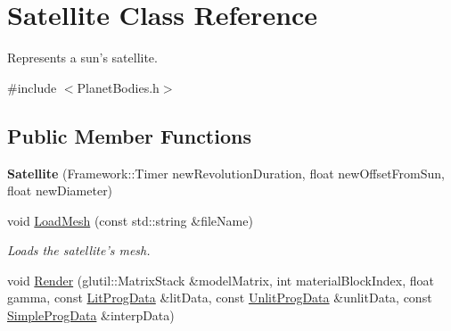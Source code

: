 \hypertarget{class_satellite}{\section{Satellite Class Reference}
\label{class_satellite}
}


Represents a sun's satellite.  




{\ttfamily \#include $<$Planet\-Bodies.\-h$>$}

\subsection*{Public Member Functions}
\begin{DoxyCompactItemize}
\item 
\hypertarget{class_satellite_a40c1e6e97b4c8447e7d92b46226a852c}{{\bfseries Satellite} (Framework\-::\-Timer new\-Revolution\-Duration, float new\-Offset\-From\-Sun, float new\-Diameter)}\label{class_satellite_a40c1e6e97b4c8447e7d92b46226a852c}

\item 
\hypertarget{class_satellite_a810947406b5df21450b07a6f9250d83e}{void \hyperlink{class_satellite_a810947406b5df21450b07a6f9250d83e}{Load\-Mesh} (const std\-::string \&file\-Name)}\label{class_satellite_a810947406b5df21450b07a6f9250d83e}

\begin{DoxyCompactList}\small\item\em Loads the satellite's mesh. \end{DoxyCompactList}\item 
\hypertarget{class_satellite_a6c61708e6a955d1676dfb2f779cf0698}{void \hyperlink{class_satellite_a6c61708e6a955d1676dfb2f779cf0698}{Render} (glutil\-::\-Matrix\-Stack \&model\-Matrix, int material\-Block\-Index, float gamma, const \hyperlink{struct_lit_prog_data}{Lit\-Prog\-Data} \&lit\-Data, const \hyperlink{struct_unlit_prog_data}{Unlit\-Prog\-Data} \&unlit\-Data, const \hyperlink{struct_simple_prog_data}{Simple\-Prog\-Data} \&interp\-Data)}\label{class_satellite_a6c61708e6a955d1676dfb2f779cf0698}


\end{DoxyCompactItemize}
